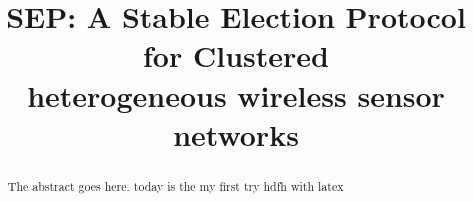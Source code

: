 \documentclass[conference]{IEEEtran}
\begin{document}
\title{SEP: A Stable Election Protocol for Clustered \\ heterogeneous wireless sensor networks}


\author{
}





% 




\maketitle


\begin{abstract}
The abstract goes here. today is the my first try hdfh  with {latex}
\end{abstract}


%
\end{document}
